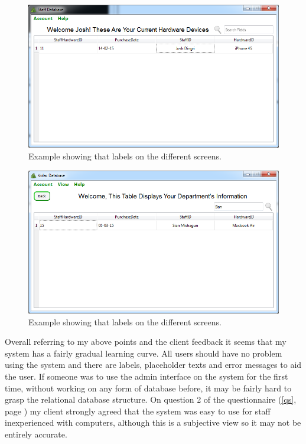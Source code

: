 \begin{figure}[H]
    \includegraphics[width=\textwidth]{./Evaluation/Images/readonlystaff.png}
    \caption{Example showing that labels on the different screens.}
\end{figure}

\begin{figure}[H]
    \includegraphics[width=\textwidth]{./Evaluation/Images/managersearch.png}
    \caption{Example showing that labels on the different screens.} 
\end{figure}

Overall referring to my above points and the client feedback it seems that my system has a fairly gradual learning curve. All users should have no problem using the system and there are labels, placeholder texts and error messages to aid the user. If someone was to use the admin interface on the system for the first time, without working on any form of database before, it may be fairly hard to grasp the relational database structure. On question 2 of the questionnaire (\ref{qs}, page \pageref{qs}) my client strongly agreed that the system was easy to use for staff inexperienced with computers, although this is a subjective view so it may not be entirely accurate.

